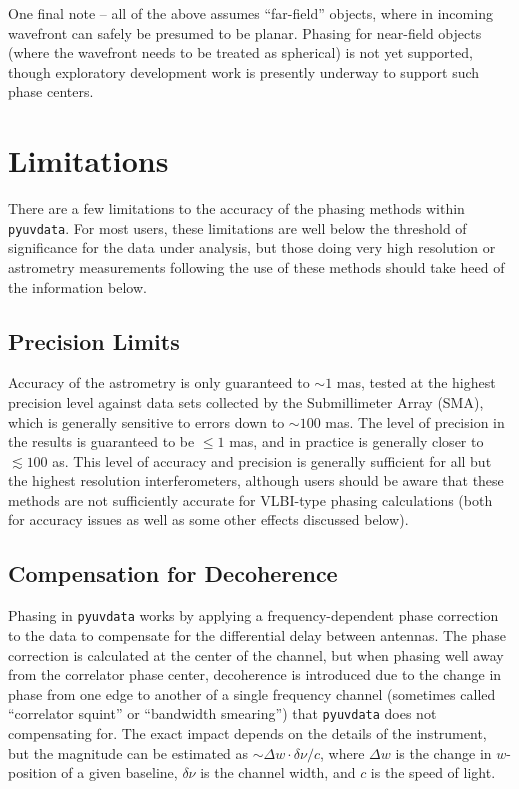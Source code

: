 \documentclass[11pt, oneside]{article}
\begin{document}
One final note -- all of the above assumes ``far-field'' objects, where in incoming wavefront can safely be presumed to be planar. Phasing for near-field objects (where the wavefront needs to be treated as spherical) is not yet supported, though exploratory development work is presently underway to support such phase centers.

\section{Limitations}\label{sec:limits}
There are a few limitations to the accuracy of the phasing methods within \texttt{pyuvdata}. For most users, these limitations are well below the threshold of significance for the data under analysis, but those doing very high resolution or astrometry measurements following the use of these methods should take heed of the information below.

\subsection{Precision Limits}
Accuracy of the astrometry is only guaranteed to $\sim1$ mas, tested at the highest precision level against data sets collected by the Submillimeter Array (SMA), which is generally sensitive to errors down to $\sim100$ mas. The level of precision in the results is guaranteed to be $\leq1$ mas, and in practice is generally closer to $\lesssim100$ {\textmu}as. This level of accuracy and precision is generally sufficient for all but the highest resolution interferometers, although users should be aware that these methods are not sufficiently accurate for VLBI-type phasing calculations (both for accuracy issues as well as some other effects discussed below). 

\subsection{Compensation for Decoherence}
Phasing in \texttt{pyuvdata} works by applying a frequency-dependent phase correction to the data to compensate for the differential delay between antennas. The phase correction is calculated at the center of the channel, but when phasing well away from the correlator phase center, decoherence is introduced due to the change in phase from one edge to another of a single frequency channel (sometimes called ``correlator squint'' or ``bandwidth smearing'') that \texttt{pyuvdata} does not compensating for. The exact impact depends on the details of the instrument, but the magnitude can be estimated as $\sim\Delta w \cdot \delta\nu / c$, where $\Delta w$ is the change in $w$-position of a given baseline, $\delta\nu$ is the channel width, and $c$ is the speed of light.
\end{document}

